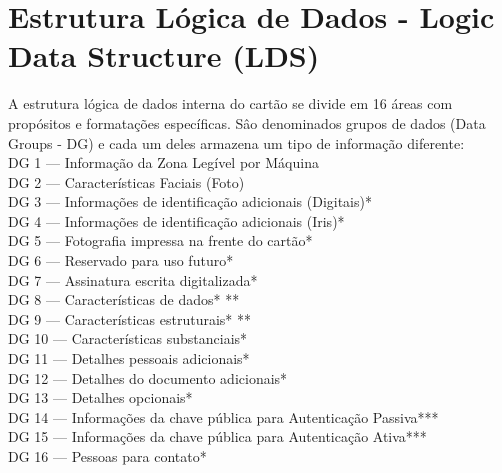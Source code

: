 \documentclass{article}
\begin{document}
	\section{Estrutura Lógica de Dados - Logic Data Structure (LDS)}
		\begin{flushleft}
			
				\hspace{2cm} A estrutura lógica de dados interna do cartão se divide em 16 áreas com propósitos e formatações específicas. Sâo denominados grupos de dados (Data Groups - DG) e cada um deles armazena um tipo de informação diferente:\\
			\vspace{10px}
			\hspace{2cm} DG 1 — Informação da Zona Legível por Máquina\\
			\hspace{2cm} DG 2 — Características Faciais (Foto)\\
			\hspace{2cm} DG 3 — Informações de identificação adicionais (Digitais)*\\
			\hspace{2cm} DG 4 — Informações de identificação adicionais (Iris)*\\
			\hspace{2cm} DG 5 — Fotografia impressa na frente do cartão*\\
			\hspace{2cm} DG 6 — Reservado para uso futuro*\\
			\hspace{2cm} DG 7 — Assinatura escrita digitalizada*\\
			\hspace{2cm} DG 8 — Características de dados* **\\
			\hspace{2cm} DG 9 — Características estruturais* **\\
			\hspace{2cm} DG 10 — Características substanciais*\\
			\hspace{2cm} DG 11 — Detalhes pessoais adicionais*\\
			\hspace{2cm} DG 12 — Detalhes do documento adicionais*\\
			\hspace{2cm} DG 13 — Detalhes opcionais*\\
			\hspace{2cm} DG 14 — Informações da chave pública para Autenticação Passiva***\\
			\hspace{2cm} DG 15 — Informações da chave pública para Autenticação Ativa***\\
			\hspace{2cm} DG 16 — Pessoas para contato*\\


\end{flushleft}
\end{document}
